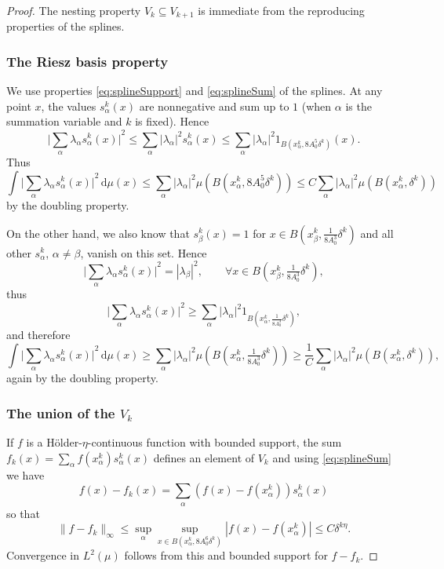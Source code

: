 \documentclass{amsart}
\numberwithin{equation}{section}
\theoremstyle{plain}
\theoremstyle{definition}
\theoremstyle{remark}
\begin{document}
{{\begin{proof}
The nesting property $V_{k}\subseteq V_{k+1}$ is immediate from the reproducing properties of the splines.

\subsubsection*{The Riesz basis property}
We use properties \eqref{eq:splineSupport} and \eqref{eq:splineSum} of the splines.
At any point $x$, the values $s^k_{\alpha}(x)$ are nonnegative and sum up to $1$ (when $\alpha$ is the summation variable and $k$ is fixed). Hence
\begin{equation*}
  {\Big|{\sum_{\alpha}\lambda_{\alpha}s^k_{\alpha}(x)}\Big|}^2
  \leq\sum_{\alpha}{|{\lambda_{\alpha}}|}^2 s^k_{\alpha}(x)\leq \sum_{\alpha}{|{\lambda_{\alpha}}|}^2  1_{B(x^k_{\alpha},8A_0^5\delta^k)}(x).
\end{equation*}
Thus
\begin{equation*}
  \int{\Big|{\sum_{\alpha}\lambda_{\alpha}s^k_{\alpha}(x)}\Big|}^2{\,\mathrm{d}}\mu(x)
  \leq\sum_{\alpha}{|{\lambda_{\alpha}}|}^2  \mu(B(x^k_{\alpha},8A_0^5\delta^k))
  \leq C\sum_{\alpha}{|{\lambda_{\alpha}}|}^2  \mu(B(x^k_{\alpha},\delta^k))
\end{equation*}
by the doubling property.

On the other hand, we also know that $s^k_{\beta}(x)=1$ for $x\in B(x^k_{\beta},\tfrac{1}{8A_{0}^3}\delta^k)$ and all other $s^k_{\alpha}$, $\alpha\neq\beta$, vanish on this set. Hence
\begin{equation*}
  {\Big|{\sum_{\alpha}\lambda_{\alpha}s^k_{\alpha}(x)}\Big|}^2
  ={|{\lambda_{\beta}}|}^2,\qquad\forall x\in B(x^k_{\beta},\tfrac{1}{8A_{0}^3}\delta^k),
\end{equation*}
thus
\begin{equation*}
  {\Big|{\sum_{\alpha}\lambda_{\alpha}s^k_{\alpha}(x)}\Big|}^2
  \geq\sum_{\alpha}{|{\lambda_{\alpha}}|}^2 1_{B(x^k_{\alpha},\tfrac{1}{8A_{0}^3}\delta^k)},
\end{equation*}
and therefore
\begin{equation*}
  \int {\Big|{\sum_{\alpha}\lambda_{\alpha}s^k_{\alpha}(x)}\Big|}^2{\,\mathrm{d}}\mu(x)
  \geq\sum_{\alpha}{|{\lambda_{\alpha}}|}^2 \mu(B(x^k_{\alpha},\tfrac{1}{8A_{0}^3}\delta^k))
  \geq\frac{1}{C}\sum_{\alpha}{|{\lambda_{\alpha}}|}^2 \mu(B(x^k_{\alpha},\delta^k)),
\end{equation*}
again by the doubling property.

\subsubsection*{The union of the  $V_{k}$}
If  $f$ is a H\"older-$\eta$-continuous function with bounded support, the sum 
$f_{k}(x)= \sum_{\alpha}f(x^k_{\alpha}) s^k_{\alpha}(x)$
defines an element of $V_{k}$ and using \eqref{eq:splineSum} we have
$$
f(x)-f_{k}(x)= \sum_{\alpha}(f(x)-f(x^k_{\alpha}) )s^k_{\alpha}(x)
$$
so that 
$$
\|f-f_{k}\|_{\infty} \le \sup_{\alpha}\sup_{x\in B(x^k_{\alpha}, 8A_{0}^6\delta ^k)}|f(x)-f(x^k_{\alpha})| \leq C \delta ^{k\eta}.
$$
 Convergence  in  $L^2(\mu)$ follows from this and bounded support for $f-f_{k}$.


\end{proof}}}
\end{document}
